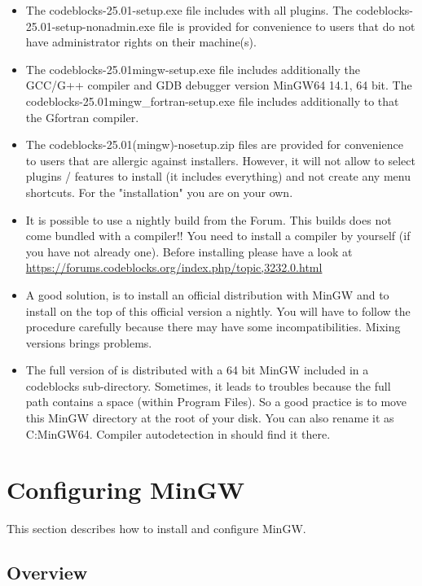 \begin{itemize}
\item The codeblocks-25.01-setup.exe file includes \codeblocks with all plugins. The codeblocks-25.01-setup-nonadmin.exe file is provided for convenience to users that do not have administrator rights on their machine(s).
\item The codeblocks-25.01mingw-setup.exe file includes additionally the GCC/G++ compiler and GDB debugger version MinGW64 14.1, 64 bit. The codeblocks-25.01mingw\_fortran-setup.exe file includes additionally to that the Gfortran compiler.
\item The codeblocks-25.01(mingw)-nosetup.zip files are provided for convenience to users that are allergic against installers. However, it will not allow to select plugins / features to install (it includes everything) and not create any menu shortcuts. For the "installation" you are on your own.
\item It is possible to use a nightly build from the Forum. This builds does not come bundled with a compiler!! You need to install a compiler by yourself (if you have not already one). Before installing please have a look at \url{https://forums.codeblocks.org/index.php/topic,3232.0.html} 
\item A good solution, is to install an official distribution with MinGW and to install on the top of this official version a nightly. You will have to follow the procedure carefully because there may have some incompatibilities. Mixing versions brings problems. 
\item The full version of \codeblocks is distributed with a 64 bit MinGW included in a codeblocks sub-directory. Sometimes, it leads to troubles because the full path contains a space (within Program Files). So a good practice is to move this MinGW directory at the root of your disk. You can also rename it as C:\osp MinGW64. Compiler autodetection in \codeblocks should find it there.
\end{itemize}

\section{Configuring MinGW}

This section describes how to install and configure MinGW.

\subsection{Overview}

